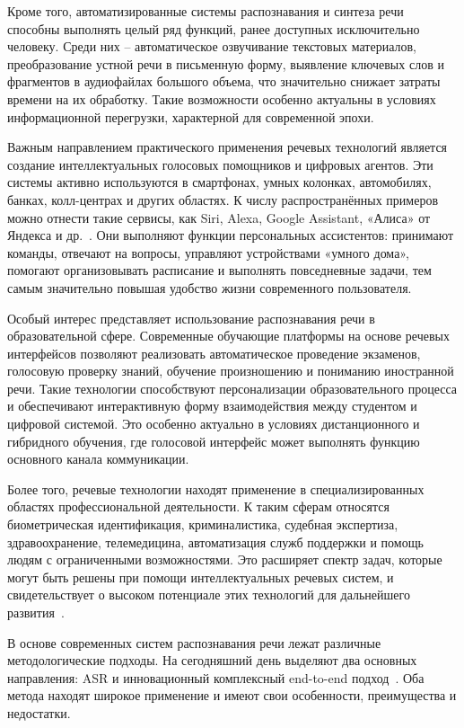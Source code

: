 Кроме того, автоматизированные системы распознавания и синтеза речи способны выполнять целый ряд функций, ранее доступных исключительно человеку. Среди них -- автоматическое озвучивание текстовых материалов, преобразование устной речи в письменную форму, выявление ключевых слов и фрагментов в аудиофайлах большого объема, что значительно снижает затраты времени на их обработку. Такие возможности особенно актуальны в условиях информационной перегрузки, характерной для современной эпохи.

Важным направлением практического применения речевых технологий является создание интеллектуальных голосовых помощников и цифровых агентов. Эти системы активно используются в смартфонах, умных колонках, автомобилях, банках, колл-центрах и других областях. К числу распространённых примеров можно отнести такие сервисы, как Siri, Alexa, Google Assistant, «Алиса» от Яндекса и др.~\cite{Hein}. Они выполняют функции персональных ассистентов: принимают команды, отвечают на вопросы, управляют устройствами «умного дома», помогают организовывать расписание и выполнять повседневные задачи, тем самым значительно повышая удобство жизни современного пользователя.

Особый интерес представляет использование распознавания речи в образовательной сфере. Современные обучающие платформы на основе речевых интерфейсов позволяют реализовать автоматическое проведение экзаменов, голосовую проверку знаний, обучение произношению и пониманию иностранной речи. Такие технологии способствуют персонализации образовательного процесса и обеспечивают интерактивную форму взаимодействия между студентом и цифровой системой. Это особенно актуально в условиях дистанционного и гибридного обучения, где голосовой интерфейс может выполнять функцию основного канала коммуникации.

Более того, речевые технологии находят применение в специализированных областях профессиональной деятельности. К таким сферам относятся биометрическая идентификация, криминалистика, судебная экспертиза, здравоохранение, телемедицина, автоматизация служб поддержки и помощь людям с ограниченными возможностями. Это расширяет спектр задач, которые могут быть решены при помощи интеллектуальных речевых систем, и свидетельствует о высоком потенциале этих технологий для дальнейшего развития~\cite{Muravyov}.

В основе современных систем распознавания речи лежат различные методологические подходы. На сегодняшний день выделяют два основных направления: ASR и инновационный комплексный end-to-end подход~\cite{Riqiang}. Оба метода находят широкое применение и имеют свои особенности, преимущества и недостатки.

